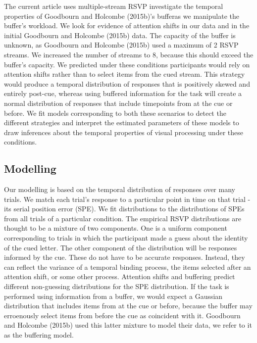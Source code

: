 \documentclass[,man]{apa6}
\theoremstyle{definition}
\theoremstyle{definition}
\theoremstyle{definition}
\theoremstyle{remark}
\begin{document}
The current article uses multiple-stream RSVP investigate the temporal
properties of Goodbourn and Holcombe (2015b)'s bufferas we manipulate
the buffer's workload. We look for evidence of attention shifts in our
data and in the initial Goodbourn and Holcombe (2015b) data. The
capacity of the buffer is unknown, as Goodbourn and Holcombe (2015b)
used a maximum of 2 RSVP streams. We increased the number of streams to
8, because this should exceed the buffer's capacity. We predicted under
these conditions participants would rely on attention shifts rather than
to select items from the cued stream. This strategy would produce a
temporal distribution of responses that is positively skewed and
entirely post-cue, whereas using buffered information for the task will
create a normal distribution of responses that include timepoints from
at the cue or before. We fit models corresponding to both these
scenarios to detect the different strategies and interpret the estimated
parameters of these models to draw inferences about the temporal
properties of visual processing under these conditions.

\subsection{Modelling}\label{modelling}

Our modelling is based on the temporal distribution of responses over
many trials. We match each trial's response to a particular point in
time on that trial - its serial position error (SPE). We fit
distributions to the distributions of SPEs from all trials of a
particular condition. The empirical RSVP distributions are thought to be
a mixture of two components. One is a uniform component corresponding to
trials in which the participant made a guess about the identity of the
cued letter. The other component of the distribution will be responses
informed by the cue. These do not have to be accurate responses.
Instead, they can reflect the variance of a temporal binding process,
the items selected after an attention shift, or some other process.
Attention shifts and buffering predict different non-guessing
distributions for the SPE distribution. If the task is performed using
information from a buffer, we would expect a Gaussian distribution that
includes items from at the cue or before, because the buffer may
erroenously select items from before the cue as coincident with it.
Goodbourn and Holcombe (2015b) used this latter mixture to model their
data, we refer to it as the buffering model.
\end{document}
